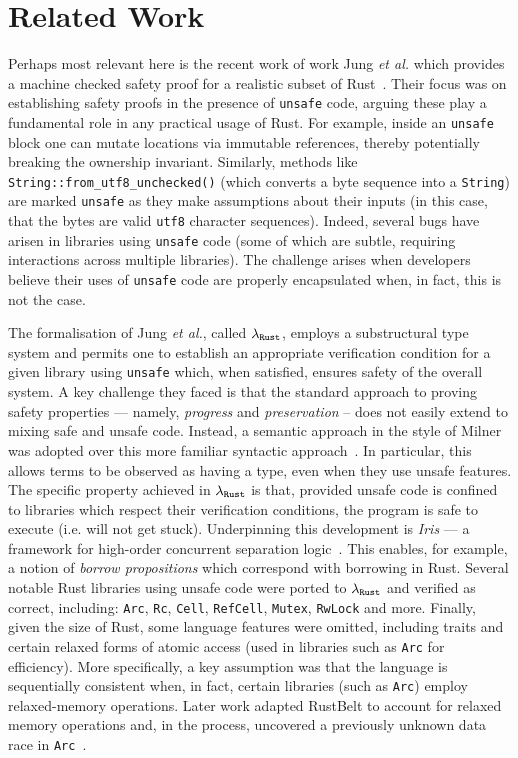 \newcommand{\FR}{}
\def\FR/{$\mathtt{FR}$}


\section{Related Work}

Perhaps most relevant here is the recent work of work Jung {\em et
  al.} which provides a machine checked safety proof for a realistic
subset of Rust~\cite{JJKD18}.  Their focus was on establishing safety
proofs in the presence of \lstinline{unsafe} code, arguing these play
a fundamental role in any practical usage of Rust.  For example,
inside an \lstinline{unsafe} block one can mutate locations via
immutable references, thereby potentially breaking the ownership
invariant.  Similarly, methods like
\lstinline{String::from_utf8_unchecked()} (which converts a byte
sequence into a \lstinline{String}) are marked \lstinline{unsafe} as
they make assumptions about their inputs (in this case, that the bytes
are valid \lstinline{utf8} character sequences).  Indeed, several bugs
have arisen in libraries using \lstinline{unsafe} code (some of which
are subtle, requiring interactions across multiple libraries).  The
challenge arises when developers believe their uses of \lstinline{unsafe}
code are properly encapsulated when, in fact, this is not the case.

The formalisation of Jung {\em et al.}, called ${\tt\lambda_{Rust}}$,
employs a substructural type system and permits one to establish an
appropriate verification condition for a given library using
\lstinline{unsafe} which, when satisfied, ensures safety of the
overall system.  A key challenge they faced is that the standard
approach to proving safety properties --- namely, {\em progress} and
{\em preservation} -- does not easily extend to mixing safe and unsafe
code.  Instead, a semantic approach in the style of Milner was adopted
over this more familiar syntactic approach~\cite{Milner78}.  In
particular, this allows terms to be observed as having a type, even
when they use unsafe features.  The specific property achieved in
${\tt\lambda_{Rust}}$ is that, provided unsafe code is confined to
libraries which respect their verification conditions, the program is
safe to execute (i.e. will not get stuck).  Underpinning this
development is {\em Iris} --- a framework for high-order concurrent
separation logic~\cite{JKBD16,KDDLV17,JKJBBD18}.  This enables, for
example, a notion of {\em borrow propositions} which correspond with
borrowing in Rust.  Several notable Rust libraries using unsafe code
were ported to ${\tt\lambda_{Rust}}$ and verified as correct,
including: \lstinline{Arc}, \lstinline{Rc}, \lstinline{Cell},
\lstinline{RefCell}, \lstinline{Mutex}, \lstinline{RwLock} and more.
Finally, given the size of Rust, some language features were omitted,
including traits and certain relaxed forms of atomic access (used in
libraries such as \lstinline{Arc} for efficiency).  More specifically,
a key assumption was that the language is sequentially consistent
when, in fact, certain libraries (such as \lstinline{Arc}) employ
relaxed-memory operations.  Later work adapted RustBelt to account for
relaxed memory operations and, in the process, uncovered a previously
unknown data race in \lstinline{Arc}~\cite{DJKD20}.

